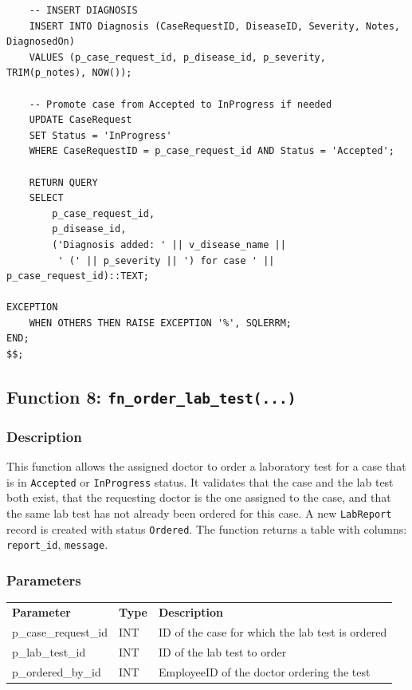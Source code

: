 \documentclass{article}
\newcommand{\theadcell}{\color{white}\bfseries}
\begin{document}
\begin{lstlisting}
    -- INSERT DIAGNOSIS
    INSERT INTO Diagnosis (CaseRequestID, DiseaseID, Severity, Notes, DiagnosedOn)
    VALUES (p_case_request_id, p_disease_id, p_severity, TRIM(p_notes), NOW());

    -- Promote case from Accepted to InProgress if needed
    UPDATE CaseRequest
    SET Status = 'InProgress'
    WHERE CaseRequestID = p_case_request_id AND Status = 'Accepted';

    RETURN QUERY
    SELECT
        p_case_request_id,
        p_disease_id,
        ('Diagnosis added: ' || v_disease_name ||
         ' (' || p_severity || ') for case ' || p_case_request_id)::TEXT;

EXCEPTION
    WHEN OTHERS THEN RAISE EXCEPTION '%', SQLERRM;
END;
$$;
\end{lstlisting}

\vspace{1em}

\subsection{Function 8: \texttt{fn\_order\_lab\_test(...)}}

\subsubsection{Description}
This function allows the assigned doctor to order a laboratory test for a case that is in \texttt{Accepted} or \texttt{InProgress} status. It validates that the case and the lab test both exist, that the requesting doctor is the one assigned to the case, and that the same lab test has not already been ordered for this case. A new \texttt{LabReport} record is created with status \texttt{Ordered}. The function returns a table with columns: \texttt{report\_id}, \texttt{message}.

\subsubsection{Parameters}

\begin{center}
\begin{tabular}{L{4.5cm} L{2.5cm} L{6.5cm}}
   \theadcell Parameter & \theadcell Type & \theadcell Description \\
   p\_case\_request\_id & INT & ID of the case for which the lab test is ordered \\
   p\_lab\_test\_id     & INT & ID of the lab test to order \\
   p\_ordered\_by\_id   & INT & EmployeeID of the doctor ordering the test \\
\end{tabular}
\end{center}
\end{document}
